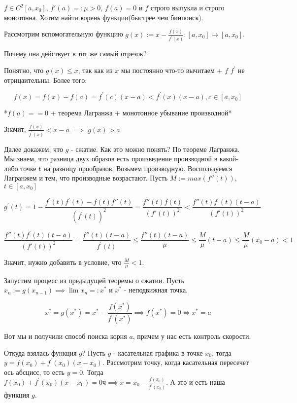 \begin{example} \thmslashn
	
	$f \in C^2[a, x_0]$, $f'(a) =: \mu > 0$, $f(a) = 0$ и $f$ строго выпукла и строго монотонна. Хотим найти корень функции(быстрее чем бинпоиск).
	
	Рассмотрим вспомогательную функцию $g(x) := x - \frac{f(x)}{f^\prime(x)} : [a, x_0] \mapsto [a, x_0]$.
	
	Почему она действует в тот же самый отрезок?
	
	Понятно, что $g(x) \le x$, так как из $x$ мы постоянно что-то вычитаем + $f$ $f^\prime$ не отрицаительны. Более того:
	
	\[
	f(x) = f(x) - f(a) = f^\prime(c)(x - a) < f^\prime(x)(x - a), c \in [a, x_0]
	\]
	
	*$f(a) == 0$ + теорема Лагранжа + монотонное убывание производной*
	
	Значит, $\frac{f(x)}{f^\prime(x)} < x - a$ $\implies$ $g(x) > a$
	
	Далее докажем, что $g$ - сжатие. Как это можно понять? По теореме Лагранжа. Мы знаем, что разница двух образов есть произведение производной в какой-либо точке t на разницу прообразов. Возьмем производную. Воспользуемся Лагранжем и тем, что производные возрастают. Пусть $M := max(f''(t))$, $t \in [a, x_0]$
	
	
	\[
	g^\prime(t) = 
	1 - \frac{f^\prime(t)f^\prime(t) - f(t) f''(t)}{(f^\prime(t))^2}
	=
	\frac{f''(t) f(t)}{(f'(t))^2} 
	<
	\frac{f''(t) f^\prime(t)(t  - a)}{(f'(t))^2}
	\]
	
	\[
	\frac{f''(t) f^\prime(t)(t  - a)}{(f'(t))^2}
	=
	\frac{f''(t)(t-a)}{f^{\prime}(t)} \le
	\frac{f''(t)(t-a)}{\mu}
	\le
	\frac{M}{\mu}(t-a)
	\le
	\frac{M}{\mu}(x_0-a)
	< 1
	\]
	
	Значит, нужно добавить в условие, что $\frac{M}{\mu} < 1$.
	
	Запустим процесс из предыдущей теоремы о сжатии. Пусть $x_n := g(x_{n - 1}) \implies \lim x_n = :x^*$ и $x^*$ - неподвижная точка.
	
	\[
	x^* = g(x^*) = x^* - \frac{f(x^*)}{f^\prime(x^*)} \implies f(x^*) = 0 \iff x^* = a
	\]
	
	Вот мы и получили способ поиска корня $a$, причем у нас есть контроль скорости.
	
\end{example}

\begin{remark} \thmslashn
	
	Откуда взялась функция $g$? Пусть $y$ - касательная графика в точке $x_0$, тогда $y = f(x_0) + f^\prime(x_0)(x - x_0)$. Рассмотрим точку, когда касательная пересечет ось абсцисс, то есть $y = 0$. Тогда  $f(x_0) + f^\prime(x_0)(x - x_0) = 0ч	 \implies x = x_0 - \frac{f(x_0)}{f^\prime(x_0)}$. А это и есть наша функция $g$.
\end{remark}